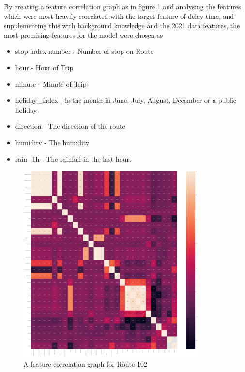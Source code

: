\documentclass[]{UCD_CS_47360_Report}
\begin{document}
By creating a feature correlation graph as in figure \ref{fig:CorrelationGraph} and analysing the features which were most heavily correlated with the target feature of delay time, and supplementing this with background knowledge and the 2021 data features, the most promising features for the model were chosen as 
\begin{itemize}
    \item stop-index-number - Number of stop on Route
    \item hour - Hour of Trip
    \item minute - Minute of Trip
    \item holiday\_index - Is the month in June, July, August, December or a public holiday
    \item direction - The direction of the route
    \item humidity - The humidity
    \item rain\_1h - The rainfall in the last hour.
\end{itemize}

\begin{figure}[!htb]
    \centering
    \includegraphics[width=0.85\textwidth]{figures/CorrelationGraph.png}
    \caption{A feature correlation graph for Route 102}
    \label{fig:CorrelationGraph}
\end{figure}
\end{document}

